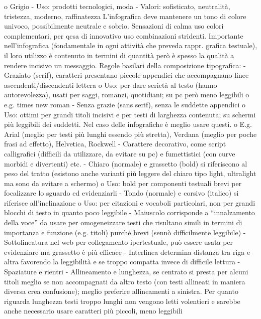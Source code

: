     o	Grigio
        -	Uso: prodotti tecnologici, moda
        -	Valori: sofisticato, neutralità, tristezza, moderno, raffinatezza
L'infografica deve mantenere un tono di colore univoco, possibilmente neutrale e sobrio.
Sensazioni di calma uso colori complementari, per qcsa di innovativo uso combinazioni stridenti.
Importante nell'infografica (fondamentale in ogni attività che preveda rappr. grafica testuale), il loro utilizzo è contenuto in termini di quantità però è spesso la qualità a rendere incisivo un messaggio.
Regole basilari della composizione tipografica:
-	Graziato (serif), caratteri presentano piccole appendici che accompagnano linee ascendenti/discendenti lettera
o	Uso: per dare serietà al testo (hanno autorevolezza), usati per saggi, romanzi, quotidiani; su pc però meno leggibili
o	e.g. times new roman
-	Senza grazie (sans serif), senza le suddette appendici
o	Uso: ottimi per grandi titoli incisivi e per testi di larghezza contenuta; su schermi più leggibili dei suddetti. Nel caso delle infografiche è meglio usare questi.
o	E.g. Arial (meglio per testi più lunghi essendo più stretta), Verdana (meglio per poche frasi ad effetto), Helvetica, Rockwell
-	Carattere decorativo, come script calligrafici (difficili da utilizzare, da evitare su pc) e fumettistici (con curve morbidi e divertenti) etc. 
-	Chiaro (normale) e grassetto (bold) si riferiscono al peso del tratto (esistono anche varianti più leggere del chiaro tipo light, ultralight ma sono da evitare a schermo)
o	Uso: bold per componenti testuali brevi per focalizzare lo sguardo ed evidenziarli
-	Tondo (normale) e corsivo (italico) si riferisce all'inclinazione 
o	Uso: per citazioni e vocaboli particolari, non per grandi blocchi di testo in quanto poco leggibile
-	Maiuscolo corrisponde a “innalzamento della voce” da usare per omogeneizzare testi che risultano simili in termini di importanza e funzione (e.g. titoli) purché brevi (sennò difficilmente leggibile)
-	Sottolineatura nel web per collegamento ipertestuale, può essere usata per evidenziare ma grassetto è più efficace
-	Interlinea determina distanza tra riga e altra favorendo la leggibilità e se troppo compatta invece di difficile lettura
-	Spaziature e rientri
-	Allineamento e lunghezza, se centrato si presta per alcuni titoli meglio se non accompagnati da altro testo (con testi allineati in maniera diversa crea confusione); meglio preferire allineamenti a sinistra. Per quanto riguarda lunghezza testi troppo lunghi non vengono letti volentieri e sarebbe anche necessario usare caratteri più piccoli, meno leggibili
